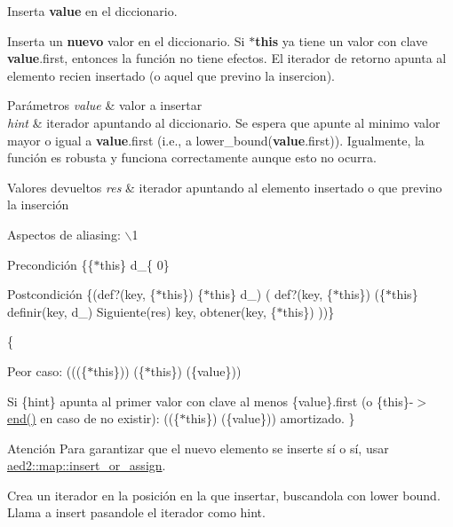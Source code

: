 \-Inserta {\bfseries value} en el diccionario. 

\-Inserta un {\bfseries nuevo} valor en el diccionario. \-Si {\bfseries $\ast$this} ya tiene un valor con clave {\bfseries value}.first, entonces la función no tiene efectos. \-El iterador de retorno apunta al elemento recien insertado (o aquel que previno la insercion).


\begin{DoxyParams}{\-Parámetros}
{\em value} & valor a insertar \\
\hline
{\em hint} & iterador apuntando al diccionario. \-Se espera que apunte al minimo valor mayor o igual a {\bfseries value}.first (i.\-e., a lower\-\_\-bound({\bfseries value}.first)). \-Igualmente, la función es robusta y funciona correctamente aunque esto no ocurra. \\
\hline
\end{DoxyParams}

\begin{DoxyRetVals}{\-Valores devueltos}
{\em res} & iterador apuntando al elemento insertado o que previno la inserción\\
\hline
\end{DoxyRetVals}
\begin{DoxyParagraph}{\-Aspectos de aliasing\-:}
$\backslash$1
\end{DoxyParagraph}
\begin{DoxyPrecond}{\-Precondición}
\{\{$\ast$this\}  d\-\_\-\{ 0\} 
\end{DoxyPrecond}
\begin{DoxyPostcond}{\-Postcondición}
\{(def?(key, \{$\ast$this\})  \{$\ast$this\}  d\-\_)  ( def?(key, \{$\ast$this\})  (\{$\ast$this\}  definir(key, d\-\_)  \-Siguiente(res)   key, obtener(key, \{$\ast$this\})  ))\}
\end{DoxyPostcond}
\{
\begin{DoxyItemize}
\item \-Peor caso\-: (((\{$\ast$this\}))  (\{$\ast$this\})  (\{value\}))
\item \-Si \{hint\} apunta al primer valor con clave al menos \{value\}.first (o \{this\}-\/$>$\hyperlink{classaed2_1_1map_a76023e6a56cb625513e1b5ea028bf983_a76023e6a56cb625513e1b5ea028bf983}{end()} en caso de no existir)\-: ((\{$\ast$this\})  (\{value\})) amortizado. \}
\end{DoxyItemize}

\begin{DoxyAttention}{\-Atención}
\-Para garantizar que el nuevo elemento se inserte sí o sí, usar \hyperlink{classaed2_1_1map_a2ef6723c183916276b0afc4a4c721475_a2ef6723c183916276b0afc4a4c721475}{aed2\-::map\-::insert\-\_\-or\-\_\-assign}.
\end{DoxyAttention}
\-Crea un iterador en la posición en la que insertar, buscandola con lower bound. \-Llama a insert pasandole el iterador como hint. 

